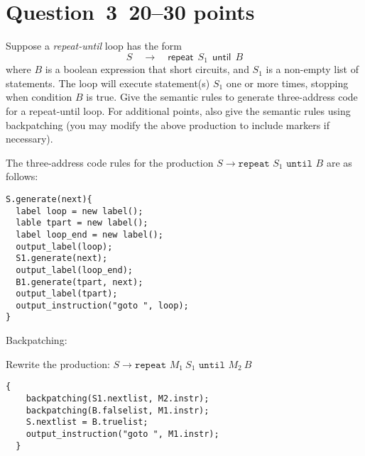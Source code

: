 \documentclass[10pt]{article}
\begin{document}
\section*{Question~3~\hfill 20--30 points}
Suppose a \emph{repeat-until} loop
has the form
\[
  S \quad \rightarrow \quad \mathsf{repeat} ~~ S_1 ~~\mathsf{until} ~~ B
\]
where $B$ is a boolean expression that short circuits,
and $S_1$ is a non-empty list of statements.
The loop will execute statement(s) $S_1$ one or more times,
stopping when condition $B$ is true.
Give the semantic rules to generate three-address code for a repeat-until loop.
For additional points, also give the semantic rules using backpatching
(you may modify the above production to include markers if necessary).
\begin{framed}
The three-address code rules for the production $S \rightarrow \texttt{repeat } S_1 \texttt{ until } B$ are as follows:


\begin{lstlisting}[style=jvm]
S.generate(next){
  label loop = new label();
  lable tpart = new label();
  label loop_end = new label();
  output_label(loop);
  S1.generate(next);
  output_label(loop_end);
  B1.generate(tpart, next);
  output_label(tpart);
  output_instruction("goto ", loop);
}
\end{lstlisting}

Backpatching:

Rewrite the production: $ S \rightarrow \texttt{repeat } M_1 \ S_1 \texttt{ until } M_2 \  B $

\begin{lstlisting}[style=jvm]
  {
    backpatching(S1.nextlist, M2.instr);
    backpatching(B.falselist, M1.instr);
    S.nextlist = B.truelist;
    output_instruction("goto ", M1.instr);
  }
\end{lstlisting}

\end{framed}
\end{document}
